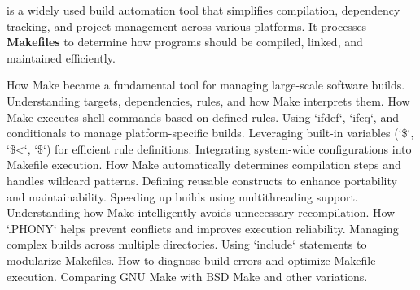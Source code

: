 \begin{NxSSSBox}[breakable][Make]
	\begin{NxIDBox}
		 is a widely used build automation tool that simplifies compilation, dependency tracking, and project management across various platforms. It processes \textbf{Makefiles} to determine how programs should be compiled, linked, and maintained efficiently.
	\end{NxIDBox}
	\begin{NxIDBoxL}
		 How Make became a fundamental tool for managing large-scale software builds.
		 Understanding targets, dependencies, rules, and how Make interprets them.
		 How Make executes shell commands based on defined rules.
		 Using `ifdef`, `ifeq`, and conditionals to manage platform-specific builds.
		 Leveraging built-in variables (`\$\@`, `\$<`, `\$\nxHat`) for efficient rule definitions.
		 Integrating system-wide configurations into Makefile execution.
		 How Make automatically determines compilation steps and handles wildcard patterns.
		 Defining reusable constructs to enhance portability and maintainability.
		 Speeding up builds using multithreading support.
		 Understanding how Make intelligently avoids unnecessary recompilation.
		 How `.PHONY` helps prevent conflicts and improves execution reliability.
		 Managing complex builds across multiple directories.
		 Using `include` statements to modularize Makefiles.
		 How to diagnose build errors and optimize Makefile execution.
		 Comparing GNU Make with BSD Make and other variations.
	\end{NxIDBoxL}
\end{NxSSSBox}

